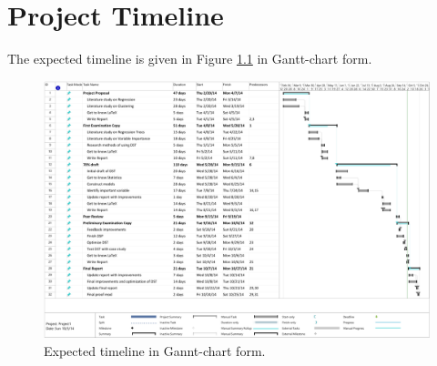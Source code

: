 \chapter{Project Timeline}

The expected timeline is given in Figure \ref{Ganttchart} in Gantt-chart form.


\begin{figure}[htb]
\centering
\includegraphics[angle=90,scale=0.6,trim=0 0 0 0, clip]{fig/Timeline}
\caption{Expected timeline in Gannt-chart form.}
\label{Ganttchart}
\end{figure}